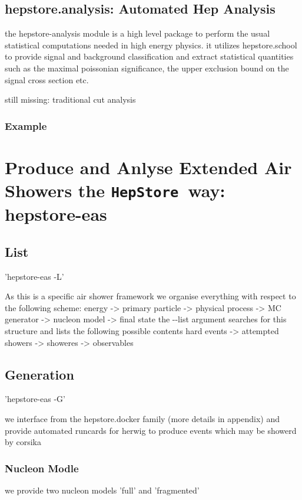 \documentclass[aps,prd,11pt,tightenlines,superscriptaddress,nofootinbib,preprintnumbers,notitlepage]{revtex4-1}
\newcommand{\hepstore}{\texttt{HepStore}}
\begin{document}
\subsection{hepstore.analysis: Automated Hep Analysis}

the hepstore-analysis module is a high level package to perform the
usual statistical computations needed in high energy physics. it
utilizes hepstore.school to provide signal and background
classification and extract statistical quantities such as the maximal
poissonian significance, the upper exclusion bound on the signal cross
section etc.

still missing: traditional cut analysis

\subsubsection{Example}

\section{Produce and Anlyse Extended Air Showers the \hepstore~way: hepstore-eas}

\subsection{List}
'hepstore-eas -L'

As this is a specific air shower framework we organise everything with
respect to the following scheme: energy -> primary particle ->
physical process -> MC generator -> nucleon model -> final state the
-{}-list argument searches for this structure and lists the following
possible contents hard events -> attempted showers -> showeres ->
observables

\subsection{Generation}

'hepstore-eas -G'

we interface from the hepstore.docker family (more details in
appendix) and provide automated runcards for herwig to produce events
which may be showerd by corsika

\subsubsection{Nucleon Modle}

we provide two nucleon models 'full' and 'fragmented'
\end{document}
